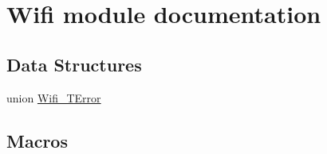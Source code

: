 \hypertarget{group___wifi__module}{\section{Wifi module documentation}
\label{group___wifi__module}
}
\subsection*{Data Structures}
\begin{DoxyCompactItemize}
\item 
union \hyperlink{union_wifi___t_error}{Wifi\-\_\-\-T\-Error}
\end{DoxyCompactItemize}
\subsection*{Macros}
